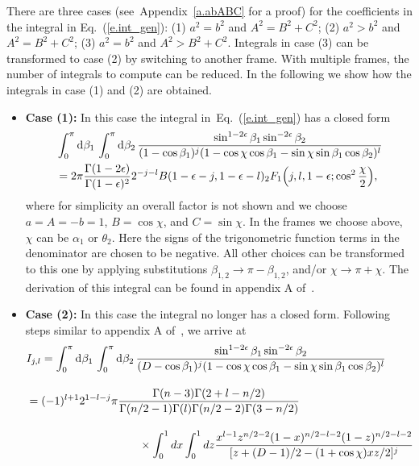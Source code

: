 \documentclass[prd,preprintnumbers,nofootinbib,superscriptaddress,onecolumn,preprint]{revtex4-1}
\newcommand\3[1]{\boldsymbol{#1}}
\newcommand{\eref}[1]{Eq.~(\ref{e.#1})}
\newcommand{\aref}[1]{Appendix~\ref{a.#1}}
\begin{document}
There are three cases (see~\aref{abABC} for a proof) for the
coefficients in the integral in \eref{int_gen}: 
(1) $a^2=b^2$ and $A^2=B^2+C^2$; 
(2) $a^2 > b^2$ and $A^2=B^2+C^2$; 
(3) $a^2= b^2$ and $A^2 > B^2+C^2$. 
Integrals in case (3) can be transformed to case (2) by switching to
another frame. With multiple frames, the number of integrals to
compute can be reduced. In the following we show how the integrals in
case (1) and (2) are obtained. 
%
\begin{itemize}
	\item[]
	\textbf{Case (1):}
	In this case the integral in~\eref{int_gen} has a closed form~\cite{vanNeerven:1985xr}
	\begin{align}
	&\int_0^{\pi} \di{\beta_1} \int_0^{\pi} \di{\beta_2} \frac{\sin^{1-2\epsilon}
		\beta_1\sin^{-2\epsilon}\beta_2}
	{(1-\cos\beta_1)^j(1-\cos\chi\cos\beta_1-\sin\chi\sin\beta_1\cos\beta_2)^l}
	\nonumber \\
	&=2\pi\frac{\Gamma(1-2\epsilon)}{\Gamma(1-\epsilon)^2}2^{-j-l}B(1-\epsilon-j,1-
	\epsilon-l)_2F_1\Bigl(j,l,1-\epsilon;\cos^2\frac{\chi}{2} \Bigr),
	\label{e.case1}
	\end{align}
	where for simplicity an overall factor  is
	not shown and we choose $a=A=-b=1$, $B=\cos\chi$, and $C=\sin\chi$.
	In the frames we choose above, $\chi$ can be $\alpha_1$ or $\theta_2$.
	Here the signs of the trigonometric function terms in the denominator
	are chosen to be negative. All other choices can be transformed to
	this one by applying substitutions $\beta_{1,2}\rightarrow \pi
	-\beta_{1,2}$, and/or $\chi \rightarrow \pi +\chi$. The derivation of
	this integral can be found in appendix A of~\cite{vanNeerven:1985xr}. 
	\item[] \textbf{Case (2):}
	In this case the integral no longer has a closed form. Following 
	steps similar to appendix A of~\cite{vanNeerven:1985xr}, we arrive at 
	\begin{align}
	&I_{j,l} = 
	\int_0^{\pi} \di{\beta_1} \int_0^{\pi} \di{\beta_2} 
	\frac{\sin^{1-2\epsilon}\beta_1\sin^{-2\epsilon}\beta_2}
	{(D-\cos\beta_1)^j(1-\cos\chi\cos\beta_1-\sin\chi\sin\beta_1\cos\beta_2)^l}
	\nonumber\\[10pt]
	&{}=(-1)^{l+1}2^{1-l-j}\pi
	\frac{\Gamma(n-3)\Gamma(2+l-n/2)}{\Gamma(n/2-1)\Gamma(l)\Gamma(n/2-2)\Gamma(3-n/2)}\nonumber
	\\[10pt]
	&\hspace{100pt} \times
	\int_0^1dx\int_0^1dz
	\frac{x^{l-1}z^{n/2-2}(1-x)^{n/2-l-2}(1-z)^{n/2-l-2}}
	{[z+(D-1)/2-(1+\cos\chi)xz/2]^j} \nonumber \\[10pt]

\end{align}
\end{itemize}
\end{document}

